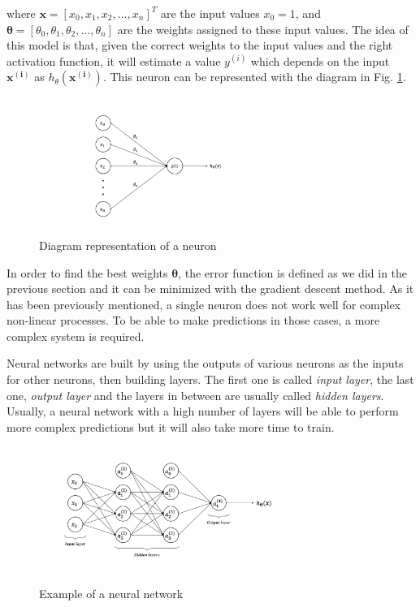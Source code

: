 \documentclass[a4paper, report, oneside, UKenglish]{memoir}
\newcommand{\x}{\boldsymbol{x}}
\newcommand{\btheta}{\boldsymbol{\theta}}
\begin{document}
where $\x = [x_0, x_1, x_2, ..., x_n]^T$ are the input values $x_0 = 1$, and $\btheta = [\theta_0, \theta_1, \theta_2, ..., \theta_n]$ are the weights assigned to these input values. The idea of this model is that, given the correct weights to the input values and the right activation function, it will estimate a value $y^{(i)}$ which depends on the input $\boldsymbol{x^{(i)}}$ as $h_\theta(\boldsymbol{x^{(i)}})$. This neuron can be represented with the diagram in Fig. \ref{fig:neuron_diag}. 

\begin{figure}[ht]
    \centering
    \includegraphics[width=0.7\textwidth]{figures/fitting/neuron_diagram.png}
    \caption{Diagram representation of a neuron}
    \label{fig:neuron_diag}
\end{figure}

In order to find the best weights $\btheta$, the error function is defined as we did in the previous section and it can be minimized with the gradient descent method. As it has been previously mentioned, a single neuron does not work well for complex non-linear processes. To be able to make predictions in those cases, a more complex system is required. 

Neural networks are built by using the outputs of various neurons as the inputs for other neurons, then building layers. The first one is called \textit{input layer}, the last one, \textit{output layer} and the layers in between are usually called \textit{hidden layers}. Usually, a neural network with a high number of layers will be able to perform more complex predictions but it will also take more time to train.

\begin{figure}[ht]
    \centering
    \includegraphics[width=0.7\textwidth]{figures/fitting/neural_network_example.png}
    \caption{Example of a neural network}
    \label{fig:neural_network_example}
\end{figure}
\end{document}
